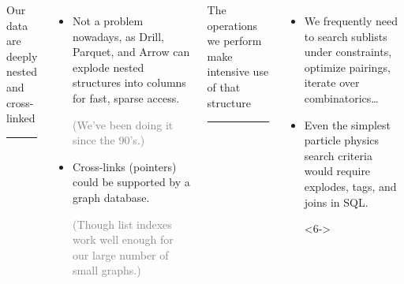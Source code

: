 \documentclass[aspectratio=169]{beamer}
\begin{document}
\begin{frame}
\vspace{0.5 cm}
\begin{columns}[t]
\begin{center}
\Large Our data are deeply nested \\ and cross-linked

\vspace{-0.25 cm}
\rule{\linewidth}{0.8 pt}
\end{center}

\vspace{-0.25 cm}
\begin{itemize}\setlength{\itemsep}{0.5 cm}
\item<2-> Not a problem nowadays, as Drill, Parquet, and Arrow can explode nested structures into columns for fast, sparse access.

\vspace{0.2 cm}
\textcolor{gray}{(We've been doing it since the 90's.)}

\item<3-> Cross-links (pointers) could be supported by a graph database.

\vspace{0.2 cm}
\textcolor{gray}{(Though list indexes work well enough for our large number of small graphs.)}

\end{itemize}

\begin{center}
\Large The operations we perform make intensive use of that structure

\vspace{-0.25 cm}
\rule{\linewidth}{0.8 pt}
\end{center}

\vspace{-0.25 cm}
\begin{itemize}
\item<4-> We frequently need to search sublists under constraints, optimize pairings, iterate over combinatorics\ldots

\item<5-> Even the simplest particle physics search criteria would require explodes, tags, and joins in SQL.

\vspace{0.5 cm}
\begin{uncoverenv}<6->
\end{uncoverenv}
\end{itemize}
\end{columns}
\end{frame}
\end{document}
